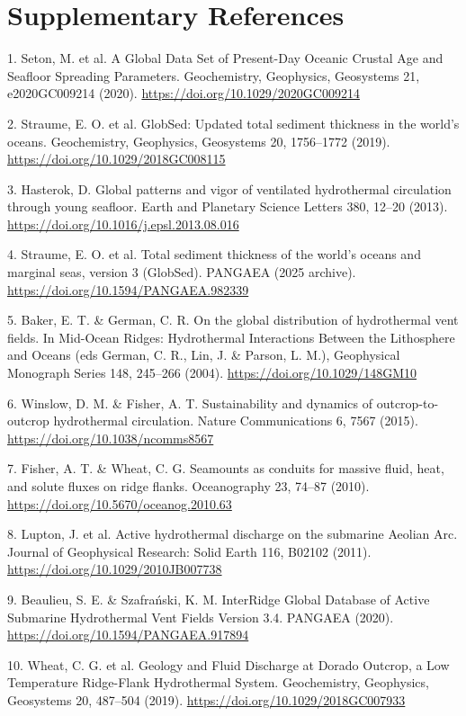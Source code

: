 \documentclass[11pt,a4paper]{article}
\begin{document}
\section*{Supplementary References}
\nolinenumbers
{\small 1. Seton, M. et al. A Global Data Set of Present-Day Oceanic Crustal Age and Seafloor Spreading Parameters. Geochemistry, Geophysics, Geosystems 21, e2020GC009214 (2020). \url{https://doi.org/10.1029/2020GC009214}\par}
{\small 2. Straume, E. O. et al. GlobSed: Updated total sediment thickness in the world's oceans. Geochemistry, Geophysics, Geosystems 20, 1756--1772 (2019). \url{https://doi.org/10.1029/2018GC008115}\par}
{\small 3. Hasterok, D. Global patterns and vigor of ventilated hydrothermal circulation through young seafloor. Earth and Planetary Science Letters 380, 12--20 (2013). \url{https://doi.org/10.1016/j.epsl.2013.08.016}\par}
{\small 4. Straume, E. O. et al. Total sediment thickness of the world's oceans and marginal seas, version 3 (GlobSed). PANGAEA (2025 archive). \url{https://doi.org/10.1594/PANGAEA.982339}\par}
{\small 5. Baker, E. T. \& German, C. R. On the global distribution of hydrothermal vent fields. In Mid-Ocean Ridges: Hydrothermal Interactions Between the Lithosphere and Oceans (eds German, C. R., Lin, J. \& Parson, L. M.), Geophysical Monograph Series 148, 245--266 (2004). \url{https://doi.org/10.1029/148GM10}\par}
{\small 6. Winslow, D. M. \& Fisher, A. T. Sustainability and dynamics of outcrop-to-outcrop hydrothermal circulation. Nature Communications 6, 7567 (2015). \url{https://doi.org/10.1038/ncomms8567}\par}
{\small 7. Fisher, A. T. \& Wheat, C. G. Seamounts as conduits for massive fluid, heat, and solute fluxes on ridge flanks. Oceanography 23, 74--87 (2010). \url{https://doi.org/10.5670/oceanog.2010.63}\par}
{\small 8. Lupton, J. et al. Active hydrothermal discharge on the submarine Aeolian Arc. Journal of Geophysical Research: Solid Earth 116, B02102 (2011). \url{https://doi.org/10.1029/2010JB007738}\par}
{\small 9. Beaulieu, S. E. \& Szafrański, K. M. InterRidge Global Database of Active Submarine Hydrothermal Vent Fields Version 3.4. PANGAEA (2020). \url{https://doi.org/10.1594/PANGAEA.917894}\par}
{\small 10. Wheat, C. G. et al. Geology and Fluid Discharge at Dorado Outcrop, a Low Temperature Ridge-Flank Hydrothermal System. Geochemistry, Geophysics, Geosystems 20, 487--504 (2019). \url{https://doi.org/10.1029/2018GC007933}\par}
\end{document}
